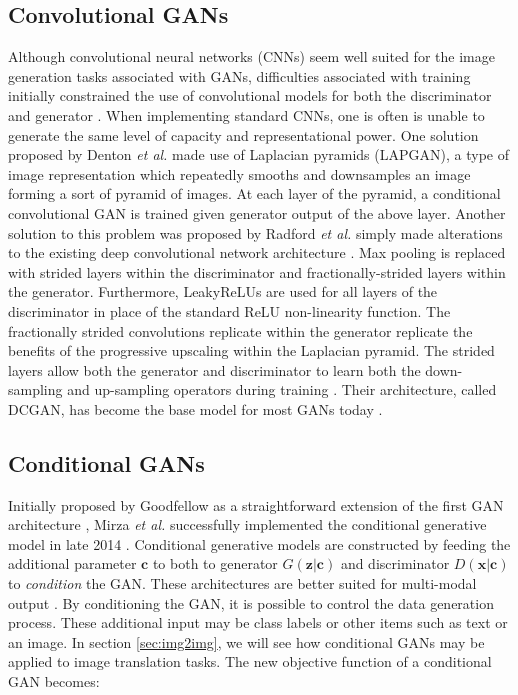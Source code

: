 \documentclass[11pt]{article}
\begin{document}
\subsection{Convolutional GANs}
Although convolutional neural networks (CNNs) seem well suited for the image generation tasks associated with GANs, difficulties associated with training initially constrained the use of convolutional models for both the discriminator and generator \citep{2017arXiv171007035C}. When implementing standard CNNs, one is often is unable to generate the same level of capacity and representational power. One solution proposed by Denton \textit{et al.} made use of Laplacian pyramids (LAPGAN), a type of image representation which repeatedly smooths and downsamples an image forming a sort of pyramid of images. At each layer of the pyramid, a conditional convolutional GAN is trained given generator output of the above layer. Another solution to this problem was proposed by Radford \textit{et al.}  simply made alterations to the existing deep convolutional network architecture \citep{2015arXiv151106434R}. Max pooling is replaced with strided layers within the discriminator and fractionally-strided layers within the generator. Furthermore, LeakyReLUs are used for all layers of the discriminator in place of the standard ReLU non-linearity function. The fractionally strided convolutions replicate within the generator replicate the benefits of the progressive upscaling within the Laplacian pyramid. The strided layers allow both the generator and discriminator to learn both the down-sampling and up-sampling operators during training \citep{2017arXiv171007035C}. Their architecture, called DCGAN, has become the base model for most GANs today \citep{2017arXiv170100160G}.

\subsection{Conditional GANs}
Initially proposed by Goodfellow as a straightforward extension of the first GAN architecture \citep{2014arXiv1406.2661G}, Mirza \textit{et al.} successfully implemented the conditional generative model in late 2014 \citep{2014arXiv1411.1784M}. Conditional generative models are constructed by feeding the additional parameter $\bm{c}$ to both to generator $G(\bm{z}|\bm{c})$ and discriminator $D(\bm{x}|\bm{c})$ to \textit{condition} the GAN. These architectures are better suited for multi-modal output \citep{2017arXiv171007035C}. By conditioning the GAN, it is possible to control the data generation process. These additional input may be class labels or other items such as text or an image. In section \ref{sec:img2img}, we will see how conditional GANs may be applied to image translation tasks. The new objective function of a conditional GAN becomes:
\end{document}

